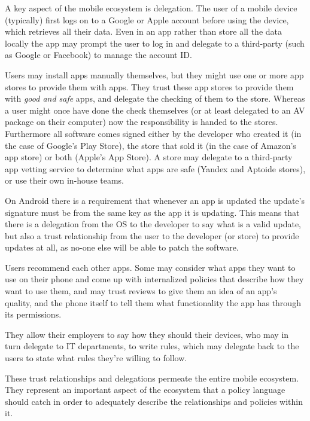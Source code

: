 \documentclass[thesis.tex]{subfiles}
\begin{document}
A key aspect of the mobile ecosystem is delegation.  The user of a
mobile device (typically) first logs on to a Google or Apple account
before using the device, which retrieves all their data.  Even in an
app rather than store all the data locally the app may prompt the user
to log in and delegate to a third-party (such as Google or Facebook)
to manage the account ID.

Users may install apps manually themselves, but they might use one or
more app stores to provide them with apps.  They trust these app
stores to provide them with \emph{good and safe} apps, and delegate
the checking of them to the store.  Whereas a user might once have
done the check themselves (or at least delegated to an \ac{AV} package
on their computer) now the responsibility is handed to the stores.
Furthermore all software comes signed either by the developer who
created it (in the case of Google's Play Store), the store that sold
it (in the case of Amazon's app store) or both (Apple's App Store).  A
store may delegate to a third-party app vetting service to determine
what apps are safe (Yandex and Aptoide stores), or use their own
in-house teams.

On Android there is a requirement that whenever
an app is updated the update's signature must be from the same key as
the app it is updating.  This means that there is a delegation from
the OS to the developer to say what is a valid update, but also a
trust relationship from the user to the developer (or store) to
provide updates at all, as no-one else will be able to patch the
software.

Users recommend each other apps.  Some may consider what apps they
want to use on their phone and come up with internalized policies that
describe how they want to use them, and may trust reviews to give them
an idea of an app's quality, and the phone itself to tell them what
functionality the app has through its permissions.

They allow their employers to say how they should their devices, who
may in turn delegate to IT departments, to write rules, which may
delegate back to the users to state what rules they're willing to
follow.

These trust relationships and delegations permeate the entire mobile
ecosystem.  They represent an important aspect of the ecosystem that a
policy language should catch in order to adequately describe the
relationships and policies within it.


\end{document}
